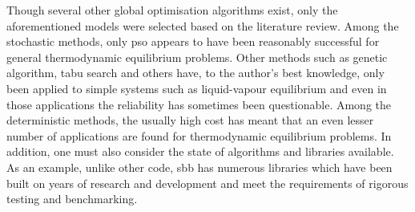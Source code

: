 Though several other global optimisation algorithms exist, only the aforementioned models were selected based on the literature review. Among the stochastic methods, only \gls{pso} appears to have been reasonably successful for general thermodynamic equilibrium problems. Other methods such as genetic algorithm, tabu search and others have, to the author's best knowledge, only been applied to simple systems such as liquid-vapour equilibrium and even in those applications the reliability has sometimes been questionable. Among the deterministic methods, the usually high cost has meant that an even lesser number of applications are found for thermodynamic equilibrium problems. In addition, one must also consider the state of algorithms and libraries available. As an example, unlike other code, \gls{sbb} has numerous libraries which have been built on years of research and development and meet the requirements of rigorous testing and benchmarking. 


